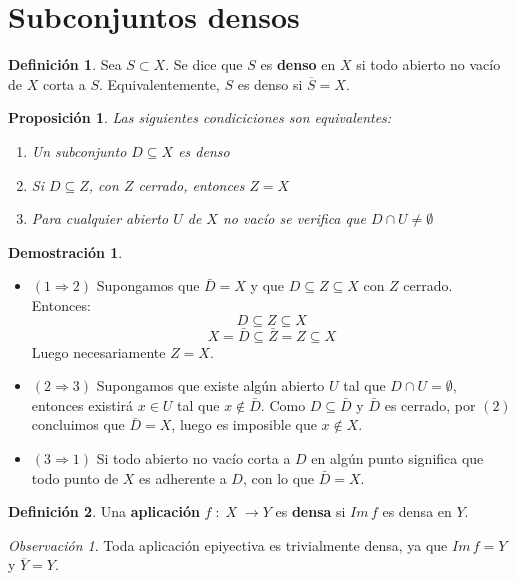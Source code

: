 \documentclass[12pt,twoside]{report}
\theoremstyle{azul}
\theoremstyle{azul2}
\theoremstyle{plain}
\newtheorem*{prop}{Proposición}
\theoremstyle{definition}
\newtheorem*{defi}{Definición}
\newtheorem*{dem}{Demostración}
\theoremstyle{remark}
\newtheorem*{obs}{Observación}
\begin{document}
\section{Subconjuntos densos}
\begin{defi}
Sea $S \subset X$. Se dice que $S$ es \textbf{denso} en $X$ si todo abierto no vacío de $X$ corta a $S$. Equivalentemente, $S$ es denso si $\overline{S} = X$.
\end{defi}
\begin{prop}
Las siguientes condiciciones son equivalentes: \vspace{-3mm}
\begin{enumerate}
    \item Un subconjunto $D\subseteq X$ es denso
    \item Si $D\subseteq Z$, con $Z$ cerrado, entonces $Z=X$
    \item Para cualquier abierto $U$ de $X$ no vacío se verifica que $D\cap U\neq \emptyset$
\end{enumerate}
\end{prop}
\begin{dem}\:\vspace{-5mm}
\begin{itemize}
\item $(1\Rightarrow 2)$ Supongamos que $\bar{D}=X$ y que $D\subseteq Z\subseteq X$ con $Z$ cerrado. Entonces:
$$D\subseteq Z\subseteq X$$
$$X=\bar{D}\subseteq \bar{Z}=Z\subseteq X$$
Luego necesariamente $Z=X$.

\item $(2\Rightarrow 3)$ Supongamos que existe algún abierto $U$ tal que $D\cap U=\emptyset$, entonces existirá $x\in U$ tal que $x\nin \bar{D}$. Como $D\subseteq\bar{D}$ y $\bar{D}$ es cerrado, por $(2)$ concluimos que $\bar{D}=X$, luego es imposible que $x\nin X$.
\item $(3\Rightarrow 1)$
Si todo abierto no vacío corta a $D$ en algún punto significa que todo punto de $X$ es adherente a $D$, con lo que $\bar{D}=X$.
\end{itemize}
\end{dem}

\begin{defi}
Una \textbf{aplicación} $f\;:\;X \;\longrightarrow Y$ es \textbf{densa} si $Im\,f$ es densa en $Y$.
\end{defi}

\begin{obs}
Toda aplicación epiyectiva es trivialmente densa, ya que $Im \, f = Y$ y $\overline{Y} = Y$.
\end{obs}
\end{document}
